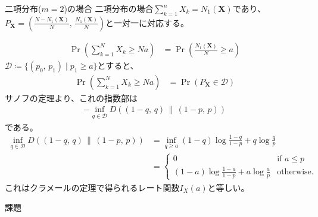 \documentclass[lualatex,handout]{beamer}
\newcommand\KL[2]{D(#1\,\|\,#2)}
\theoremstyle{definition}
\begin{document}
\begin{frame}{二項分布($m=2$)の場合}
\footnotesize
二項分布の場合$\sum_{k=1}^n X_k=N_1(\symbf{X})$であり、$P_{\symbf{X}}=\left(\frac{N-N_1(\symbf{X})}N,\,\frac{N_1(\symbf{X})}N\right)$と一対一に対応する。

\begin{align*}
\Pr\left(\sum_{k=1}^N X_k \ge Na\right)
&=
\Pr\left(\frac{N_1(\symbf{X})}{N} \ge a\right)
\end{align*}
$\mathcal{D}\coloneq \{(p_0,\,p_1)\mid p_1\ge a\}$とすると、
\begin{align*}
\Pr\left(\sum_{k=1}^N X_k \ge Na\right)
&=
\Pr\left(P_{\symbf{X}} \in\mathcal{D}\right)
\end{align*}
サノフの定理より、これの指数部は
\begin{align*}
-\inf_{q\in\mathcal{D}} \KL{(1-q,\,q)}{(1-p,\,p)}
\end{align*}
である。
\begin{align*}
\inf_{q\in\mathcal{D}} \KL{(1-q,\,q)}{(1-p,\,p)}&= \inf_{q\ge a} (1-q)\log\frac{1-q}{1-p} + q\log\frac{q}{p}\\
&= 
\begin{cases}
0&\text{if } a\le p\\
(1-a)\log\frac{1-a}{1-p} + a\log\frac{a}{p}& \text{otherwise.}
\end{cases}
\end{align*}
これはクラメールの定理で得られるレート関数$I_X(a)$と等しい。
\end{frame}

\begin{frame}{課題}
\end{frame}
\end{document}
